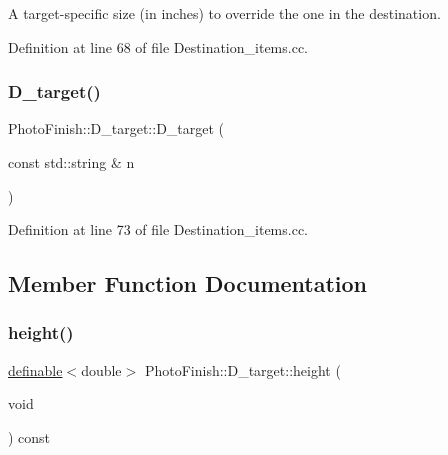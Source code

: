 A target-\/specific size (in inches) to override the one in the destination. 



Definition at line 68 of file Destination\+\_\+items.\+cc.

\mbox{\label{class_photo_finish_1_1_d__target_a9aee6452b1a9bcc76b98b7a33bde4b06}} 
\subsubsection{\texorpdfstring{D\+\_\+target()}{D\_target()}\hspace{0.1cm}{\footnotesize\ttfamily [2/2]}}
{\footnotesize\ttfamily Photo\+Finish\+::\+D\+\_\+target\+::\+D\+\_\+target (\begin{DoxyParamCaption}\item[{const std\+::string \&}]{n }\end{DoxyParamCaption})}



Definition at line 73 of file Destination\+\_\+items.\+cc.



\subsection{Member Function Documentation}
\mbox{\label{class_photo_finish_1_1_d__target_a03f87d787b34742a2bca4da14dfe3ce6}} 
\subsubsection{\texorpdfstring{height()}{height()}}
{\footnotesize\ttfamily \hyperlink{class_photo_finish_1_1definable}{definable}$<$double$>$ Photo\+Finish\+::\+D\+\_\+target\+::height (\begin{DoxyParamCaption}\item[{void}]{ }\end{DoxyParamCaption}) const\hspace{0.3cm}{\ttfamily [inline]}}



